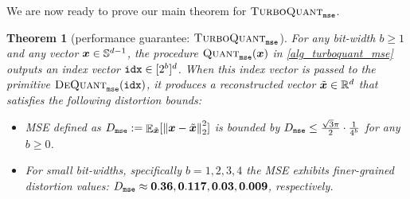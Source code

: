 \documentclass[11pt]{article}
\newtheorem{theorem}{Theorem}
\newcommand{\TurboQuant}{\textsc{TurboQuant}\xspace}
\begin{document}
We are now ready to prove our main theorem for $\TurboQuant_{\tt mse}$.
\begin{theorem}[performance guarantee: $\TurboQuant_{\tt mse}$]\label{thrm_mse}
For any bit-width $b \ge 1$ and any vector ${\bm x} \in \mathbb{S}^{d-1}$, the procedure $\textsc{Quant}_{\tt mse}({\bm x})$ in \cref{alg_turboquant_mse} outputs an index vector ${\tt idx} \in [2^b]^d$. 
When this index vector is passed to the primitive $\textsc{DeQuant}_{\tt mse}({\tt idx})$, it produces a reconstructed vector $\tilde{{\bm x}} \in \mathbb{R}^d$ that satisfies the following distortion bounds:
\begin{itemize}
    \item MSE defined as $D_{\tt mse} := \mathop{{\mathbb{E}}}_{\tilde{{\bm x}}}[ \left\| {\bm x} - \tilde{{\bm x}} \right\|_2^2 ]$ is bounded by $D_{\tt mse} \le \frac{\sqrt{3} \pi}{2} \cdot \frac{1}{4^{b}}$ for any $b \ge 0$.
    \item For small bit-widths, specifically $b = 1, 2, 3, 4$ the MSE exhibits finer-grained distortion values: $D_{\tt mse} \approx {\bf 0.36}, {\bf 0.117}, {\bf 0.03}, {\bf 0.009}$, respectively.
\end{itemize}
\end{theorem}
\end{document}
